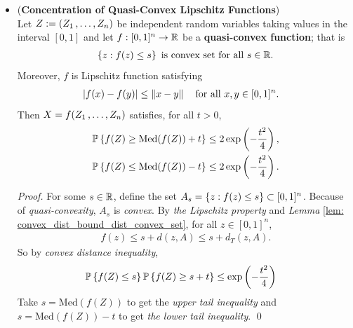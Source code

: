 \documentclass[11pt]{article}
\begin{document}
\begin{itemize}
\item \begin{theorem} (\textbf{Concentration of Quasi-Convex Lipschitz Functions}) \citep{boucheron2013concentration}\\
Let  $Z:= (Z_1 \,{,}\ldots{,}\, Z_{n})$ be independent random variables taking values in the interval $[0, 1]$ and let $f : [0, 1]^n \to {\mathbb R}$ be a \textbf{quasi-convex function}; that is
\begin{align*}
\left\{z: f(z) \le s\right\} \text{ is convex set for all }s \in {\mathbb R}. 
\end{align*} Moreover, $f$ is Lipschitz function satisfying
\begin{align*}
\left\lvert f(x) - f(y) \right\rvert &\le \left\|x - y\right\|_{} \quad \text{for all }x, y \in [0, 1]^n.
\end{align*}
Then $X = f(Z_1 \,{,}\ldots{,}\, Z_{n})$ satisfies, for all $t > 0$,
\begin{align}
{\mathbb P}\left\{f(Z)  \ge  \text{Med}(f(Z)) + t \right\} &\le 2\exp\left(- \frac{t^2}{4}\right), \label{ineqn: convex_lipschitz_concentration_med} \\
{\mathbb P}\left\{f(Z)  \le \text{Med}(f(Z)) -t \right\} &\le 2\exp\left(- \frac{t^2}{4}\right). \nonumber
\end{align}
\end{theorem}
\begin{proof}
For some $s \in {\mathbb R}$, define the set $A_s = \left\{z : f(z) \le s\right\} \subset [0, 1]^n$.  Because of \emph{quasi-convexity}, $A_s$ is \emph{convex}.  By \emph{the Lipschitz property} and \emph{Lemma} \ref{lem: convex_dist_bound_dist_convex_set}, for all $z \in [0, 1]^n$,
\begin{align*}
f(z) \le s +  d(z, A) \le s + d_{T}(z, A).
\end{align*} So by \emph{convex distance inequality}, 
\begin{align*}
{\mathbb P}\left\{f(Z) \le s\right\} {\mathbb P}\left\{f(Z) \ge s + t\right\} &\le \exp\left(- \frac{t^2}{4}\right)
\end{align*} Take $s = \text{Med}(f(Z))$ to get the \emph{upper tail inequality} and $s = \text{Med}(f(Z)) - t$ to get \emph{the lower tail inequality}. \qed
\end{proof}
\end{itemize}
\end{document}
